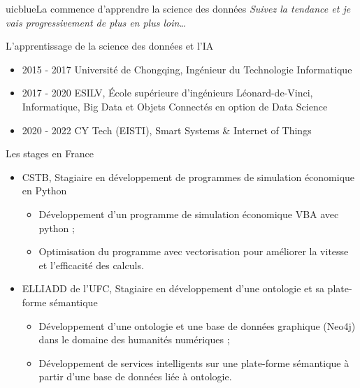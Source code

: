 \documentclass{beamer}
\begin{document}
	\begin{chapter}{uicblue}{La commence d'apprendre la science des données}
		\textit{Suivez la tendance et je vais progressivement de plus en plus loin…}
	\end{chapter}
	
	\begin{frame}[fragile]{L'apprentissage de la science des données et l'IA}
		\begin{itemize}[<+->]
			\item 2015 - 2017 Université de Chongqing, Ingénieur du Technologie Informatique
			\item 2017 - 2020 ESILV, École supérieure d'ingénieurs Léonard-de-Vinci, Informatique, Big Data et Objets Connectés en option de Data Science 
			\item 2020 - 2022 CY Tech (EISTI), Smart Systems \& Internet of Things 
		\end{itemize}
	\end{frame}
	
	\begin{frame}[fragile]{Les stages en France}
		\begin{itemize}
			\item CSTB, Stagiaire en développement de programmes de simulation économique en Python
			\begin{itemize}
				\item Développement d'un programme de simulation économique VBA avec python ;
				\item Optimisation du programme avec vectorisation pour améliorer la vitesse et l'efficacité des calculs.
			\end{itemize}
			\item ELLIADD de l'UFC, Stagiaire en développement d'une ontologie et sa plate-forme sémantique
			\begin{itemize}
				\item Développement d'une ontologie et une base de données graphique (Neo4j) dans le domaine des humanités numériques ;
				\item Développement de services intelligents sur une plate-forme sémantique à partir d'une base de données liée à ontologie.
			\end{itemize}
		\end{itemize}
	\end{frame}
	
\end{document}
